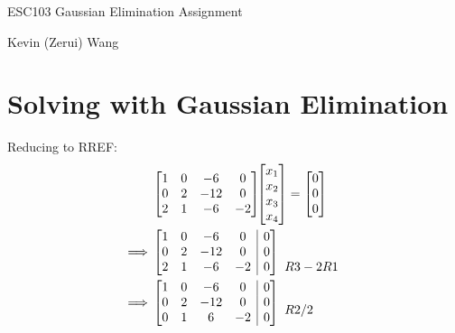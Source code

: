 \documentclass[11pt]{article}
\begin{document}
{
    \begin{center}
        \huge
        ESC103 Gaussian Elimination Assignment
    \end{center}

    \begin{center}
        \large
        Kevin (Zerui) Wang
    \end{center}

    \vspace{3ex}
}

\section{Solving with Gaussian Elimination}
Reducing to RREF:
\begin{align*}
& \begin{bmatrix}
    1 & 0 & -6 & 0 \\
    0 & 2 & -12 & 0 \\
    2 & 1 & -6 & -2
\end{bmatrix}\!\!
\begin{bmatrix}
    x_1 \\
    x_2 \\
    x_3 \\
    x_4
\end{bmatrix}  =
\begin{bmatrix}
    0 \\
    0 \\
    0
\end{bmatrix} \\
\implies & \left[\begin{array}{@{}cccc|c@{}}
    1 & 0 & -6 & 0 & 0\\
    0 & 2 & -12 & 0 & 0\\
    2 & 1 & -6 & -2 & 0
\end{array} \right]
\begin{array}{c}
    \\
    \\
    \!R3-2R1
\end{array} \\
\implies & \left[\begin{array}{@{}cccc|c@{}}
    1 & 0 & -6 & 0 & 0\\
    0 & 2 & -12 & 0 & 0\\
    0 & 1 & 6 & -2 & 0
\end{array} \right]
\begin{array}{c}
    \\
    \!R2/2\\

\end{array}
\end{align*}
\end{document}
